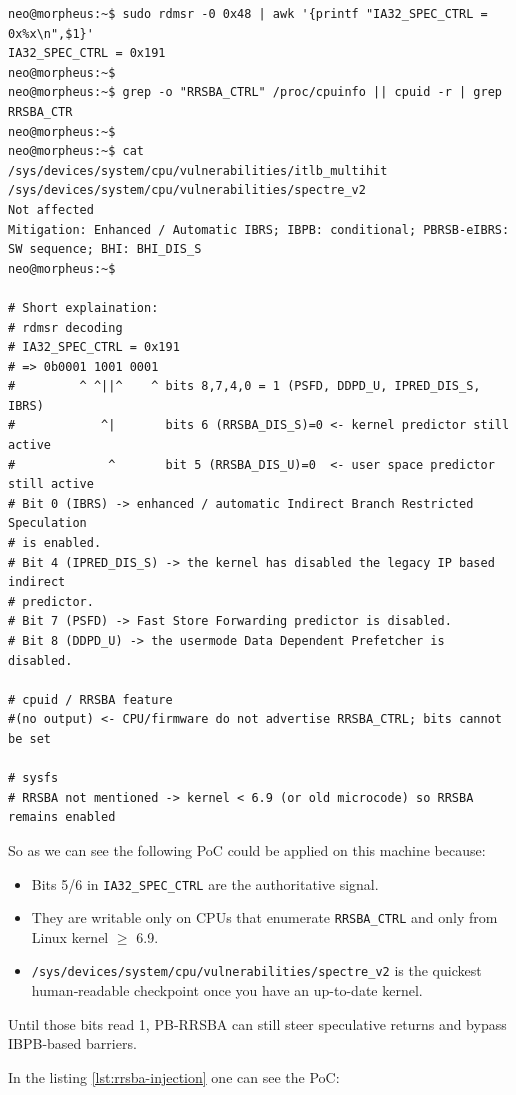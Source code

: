 \documentclass[11pt,a4paper]{article}
\begin{document}
\vspace{-0.5em}
\begin{lstlisting}[style=bash-nonitalic, caption={\texttt{attacker\_rrsba\_injection\_test.sh}}]
neo@morpheus:~$ sudo rdmsr -0 0x48 | awk '{printf "IA32_SPEC_CTRL = 0x%x\n",$1}'
IA32_SPEC_CTRL = 0x191
neo@morpheus:~$
neo@morpheus:~$ grep -o "RRSBA_CTRL" /proc/cpuinfo || cpuid -r | grep RRSBA_CTR
neo@morpheus:~$
neo@morpheus:~$ cat /sys/devices/system/cpu/vulnerabilities/itlb_multihit /sys/devices/system/cpu/vulnerabilities/spectre_v2
Not affected
Mitigation: Enhanced / Automatic IBRS; IBPB: conditional; PBRSB-eIBRS: SW sequence; BHI: BHI_DIS_S
neo@morpheus:~$

# Short explaination:
# rdmsr decoding
# IA32_SPEC_CTRL = 0x191
# => 0b0001 1001 0001
#         ^ ^||^    ^ bits 8,7,4,0 = 1 (PSFD, DDPD_U, IPRED_DIS_S, IBRS)
#            ^|       bits 6 (RRSBA_DIS_S)=0 <- kernel predictor still active
#             ^       bit 5 (RRSBA_DIS_U)=0  <- user space predictor still active
# Bit 0 (IBRS) -> enhanced / automatic Indirect Branch Restricted Speculation
# is enabled.
# Bit 4 (IPRED_DIS_S) -> the kernel has disabled the legacy IP based indirect
# predictor.
# Bit 7 (PSFD) -> Fast Store Forwarding predictor is disabled.
# Bit 8 (DDPD_U) -> the usermode Data Dependent Prefetcher is disabled.

# cpuid / RRSBA feature
#(no output) <- CPU/firmware do not advertise RRSBA_CTRL; bits cannot be set

# sysfs
# RRSBA not mentioned -> kernel < 6.9 (or old microcode) so RRSBA remains enabled
\end{lstlisting}

So as we can see the following PoC could be applied on this machine because:
\begin{itemize}
    \item Bits 5/6 in \texttt{IA32\_SPEC\_CTRL} are the authoritative signal.
    \item They are writable only on CPUs that enumerate \texttt{RRSBA\_CTRL} and only from Linux kernel $\geq$ 6.9.
    \item \texttt{/sys/devices/system/cpu/vulnerabilities/spectre\_v2} is the quickest human‑readable checkpoint once you have an up-to-date kernel.
\end{itemize}

Until those bits read 1, PB‑RRSBA can still steer speculative returns and bypass IBPB-based barriers.

In the listing \ref{lst:rrsba-injection} one can see the PoC:\\
\end{document}
